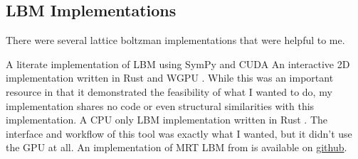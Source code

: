 \subsection{LBM Implementations}

There were several lattice boltzman implementations that were helpful to me.
\begin{outline}
  \1 A literate implementation of LBM using SymPy and CUDA \cite{web:literate_lbm}
  \1 An interactive 2D implementation written in Rust and WGPU \cite{web:lbm-web}.
  \2 While this was an important resource in that it demonstrated 
  the feasibility of what I wanted to do, 
  my implementation shares no code or even structural similarities 
  with this implementation.
  \1 A CPU only LBM implementation written in Rust \cite{web:lbm-rs}.
  \2 The interface and workflow of this tool was exactly what I wanted, but it didn't use the GPU at all.
  \1 An implementation of MRT LBM from \cite{Yang2022} is available on \href{https://github.com/yjhp1016/taichi_LBM3D/}{github}.
\end{outline}
